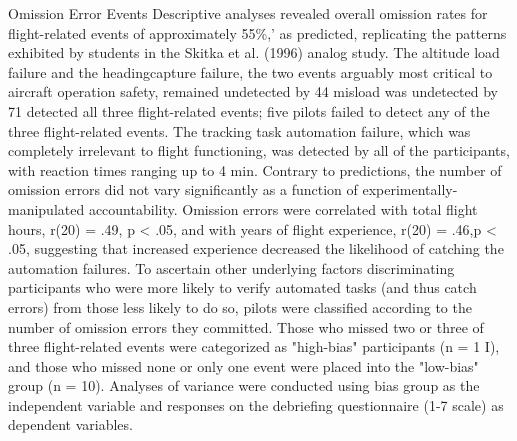\documentclass[utf8,bachelor,manualbib]{gradu3}
\begin{document}
Omission Error Events
Descriptive analyses revealed overall omission rates for flight-related events of
approximately 55\%,' as predicted, replicating the patterns exhibited by students in
the Skitka et al. (1996) analog study. The altitude load failure and the headingcapture failure, the two events arguably most critical to aircraft operation safety,
remained undetected by 44%
misload was undetected by 71%
detected all three flight-related events; five pilots failed to detect any of the three
flight-related events. The tracking task automation failure, which was completely
irrelevant to flight functioning, was detected by all of the participants, with reaction
times ranging up to 4 min.
Contrary to predictions, the number of omission errors did not vary significantly
as a function of experimentally-manipulated accountability. Omission errors were
correlated with total flight hours, r(20) = .49, p < .05, and with years of flight
experience, r(20) = .46,p < .05, suggesting that increased experience decreased the
likelihood of catching the automation failures. To ascertain other underlying factors
discriminating participants who were more likely to verify automated tasks (and
thus catch errors) from those less likely to do so, pilots were classified according
to the number of omission errors they committed. Those who missed two or three
of three flight-related events were categorized as "high-bias" participants (n = 1 I),
and those who missed none or only one event were placed into the "low-bias" group
(n = 10). Analyses of variance were conducted using bias group as the independent
variable and responses on the debriefing questionnaire (1-7 scale) as dependent
variables.
\end{document}
